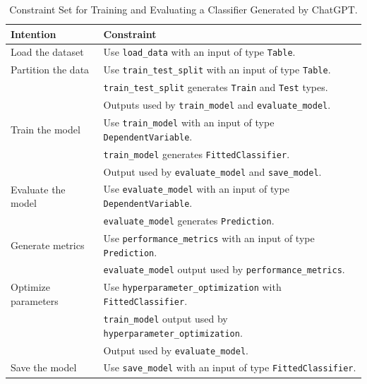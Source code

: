 \begin{table}[h]
\centering
\caption{Constraint Set for Training and Evaluating a Classifier Generated by ChatGPT.}
\label{tab:chatgpt_constraint_set}
\begin{tabular}{|l|l|}
\hline
\textbf{Intention} & \textbf{Constraint} \\
\hline
Load the dataset & Use \texttt{load\_data} with an input of type \texttt{Table}. \\
\hline
Partition the data & Use \texttt{train\_test\_split} with an input of type \texttt{Table}. \\
& \texttt{train\_test\_split} generates \texttt{Train} and \texttt{Test} types. \\
& Outputs used by \texttt{train\_model} and \texttt{evaluate\_model}. \\
\hline
Train the model & Use \texttt{train\_model} with an input of type \texttt{DependentVariable}. \\
& \texttt{train\_model} generates \texttt{FittedClassifier}. \\
& Output used by \texttt{evaluate\_model} and \texttt{save\_model}. \\
\hline
Evaluate the model & Use \texttt{evaluate\_model} with an input of type \texttt{DependentVariable}. \\
& \texttt{evaluate\_model} generates \texttt{Prediction}. \\
\hline
Generate metrics & Use \texttt{performance\_metrics} with an input of type \texttt{Prediction}. \\
& \texttt{evaluate\_model} output used by \texttt{performance\_metrics}. \\
\hline
Optimize parameters & Use \texttt{hyperparameter\_optimization} with \texttt{FittedClassifier}. \\
& \texttt{train\_model} output used by \texttt{hyperparameter\_optimization}. \\
& Output used by \texttt{evaluate\_model}. \\
\hline
Save the model & Use \texttt{save\_model} with an input of type \texttt{FittedClassifier}. \\
\hline
\end{tabular}
\end{table}

